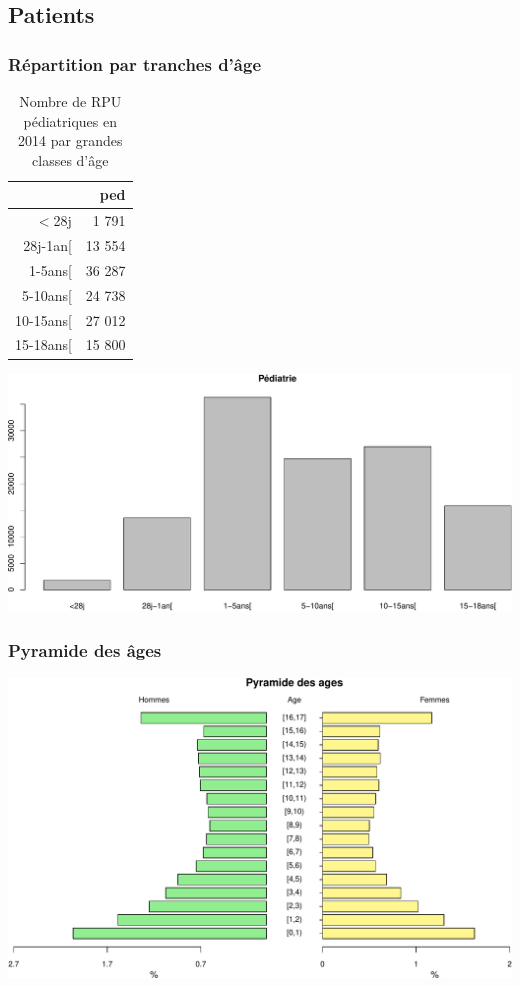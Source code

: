 \documentclass[]{article}
\begin{document}
\subsection{Patients}\label{patients-1}

\subsubsection{Répartition par tranches
d'âge}\label{repartition-par-tranches-dage}

\begin{table}[ht]
\centering
\begin{tabular}{rr}
  \hline
 & ped \\ 
  \hline
$<$28j & 1 791 \\ 
  28j-1an[ & 13 554 \\ 
  1-5ans[ & 36 287 \\ 
  5-10ans[ & 24 738 \\ 
  10-15ans[ & 27 012 \\ 
  15-18ans[ & 15 800 \\ 
   \hline
\end{tabular}
\caption{Nombre de RPU pédiatriques en 2014 par grandes classes d'âge} 
\end{table}

\includegraphics{Figs/unnamed-chunk-9-1.pdf}

\subsubsection{Pyramide des âges}\label{pyramide-des-ages}

\includegraphics{Figs/unnamed-chunk-10-1.pdf}
\end{document}
